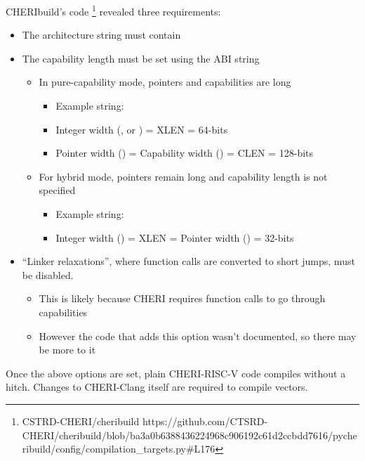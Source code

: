 \documentclass[../thesis]{subfiles}
\begin{document}
CHERIbuild's code%
\footnote{%
%
    {CSTRD-CHERI/cheribuild}%
    {https://github.com/CTSRD-CHERI/cheribuild/blob/ba3a0b6388436224968c906192c61d2ccbdd7616/pycheribuild/config/compilation_targets.py\#L176}%
} revealed three requirements:
\begin{itemize}
    \item The architecture string must contain 
    \item The capability length must be set using the ABI string
    \begin{itemize}
        \item In pure-capability mode, pointers and capabilities are  long
        \begin{itemize}
            \item Example string: 
            \item Integer width (, or ) = XLEN = 64-bits
            \item Pointer width () = Capability width () = CLEN = 128-bits
        \end{itemize}
        \item For hybrid mode, pointers remain  long and capability length is not specified
        \begin{itemize}
            \item Example string: 
            \item Integer width () = XLEN = Pointer width () = 32-bits
        \end{itemize}
    \end{itemize}
    \item ``Linker relaxations'', where function calls are converted to short jumps\cite{chenCompilerSupportLinker2019}, must be disabled.
    \begin{itemize}
        \item This is likely because CHERI requires function calls to go through capabilities
        \item However the code that adds this option wasn't documented, so there may be more to it
    \end{itemize}
\end{itemize}

Once the above options are set, plain CHERI-RISC-V code compiles without a hitch.
Changes to CHERI-Clang itself are required to compile vectors.
\end{document}
